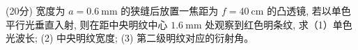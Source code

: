 \documentclass{njustexam}
\begin{document}





\begin{problem}{(20分)}
  宽度为 $a=0.6 \mathrm{~mm}$ 的狭缝后放置一焦距为 $f=40 \mathrm{~cm}$ 的凸透镜, 若以单色平行光垂直入射, 则在距中央明纹中心 $1.6 \mathrm{~mm}$ 处观察到红色明条纹,
   求（1）单色光波长; (2) 中央明纹宽度; (3) 第二级明纹对应的衍射角。
 \end{problem}
\end{document}
